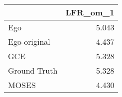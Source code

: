 \begin{tabular}{lr}
\toprule
{} & LFR_om_1 \\
\midrule
Ego          &    5.043 \\
Ego-original &    4.437 \\
GCE          &    5.328 \\
Ground Truth &    5.328 \\
MOSES        &    4.430 \\
\bottomrule
\end{tabular}
